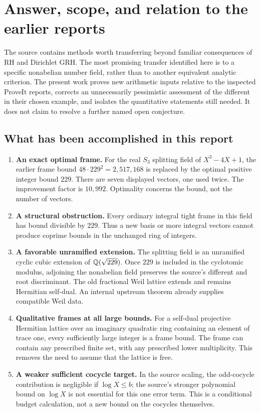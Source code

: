 \section{Answer, scope, and relation to the earlier reports}

The source contains methods worth transferring beyond familiar consequences of RH and Dirichlet GRH. The most promising transfer identified here is to a specific nonabelian number field, rather than to another equivalent analytic criterion. The present work proves new arithmetic inputs relative to the inspected ProveIt reports, corrects an unnecessarily pessimistic assessment of the different in their chosen example, and isolates the quantitative statements still needed. It does not claim to resolve a further named open conjecture.

\subsection{What has been accomplished in this report}

\begin{enumerate}
\item \textbf{An exact optimal frame.} For the real $S_3$ splitting field of $X^3-4X+1$, the earlier frame bound $48\cdot229^2=2{,}517{,}168$ is replaced by the optimal positive integer bound $229$. There are seven displayed vectors, one used twice. The improvement factor is $10{,}992$. Optimality concerns the bound, not the number of vectors.
\item \textbf{A structural obstruction.} Every ordinary integral tight frame in this field has bound divisible by $229$. Thus a new basis or more integral vectors cannot produce coprime bounds in the unchanged ring of integers.
\item \textbf{A favorable unramified extension.} The splitting field is an unramified cyclic cubic extension of $\mathbb Q(\sqrt{229})$. Once $229$ is included in the cyclotomic modulus, adjoining the nonabelian field preserves the source's different and root discriminant. The old fractional Weil lattice extends and remains Hermitian self-dual. An internal upstream theorem already supplies compatible Weil data.
\item \textbf{Qualitative frames at all large bounds.} For a self-dual projective Hermitian lattice over an imaginary quadratic ring containing an element of trace one, every sufficiently large integer is a frame bound. The frame can contain any prescribed finite set, with any prescribed lower multiplicity. This removes the need to assume that the lattice is free.
\item \textbf{A weaker sufficient cocycle target.} In the source scaling, the odd-cocycle contribution is negligible if $\log X\le b$; the source's stronger polynomial bound on $\log X$ is not essential for this one error term. This is a conditional budget calculation, not a new bound on the cocycles themselves.
\end{enumerate}

